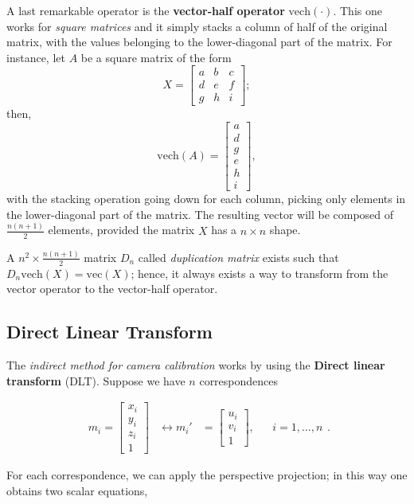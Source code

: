 \documentclass[10pt]{report}
\begin{document}
A last remarkable operator is the \textbf{vector\--half operator} \(\mbox{vech}(\cdot)\). This one works for \emph{square matrices} and it simply stacks a column of half of the original matrix, with the values belonging to the lower\--diagonal part of the matrix. For instance, let \(A\) be a square matrix of the form $$X = \begin{bmatrix} a & b & c \\ d & e & f \\ g & h & i\end{bmatrix};$$ then, $$\mbox{vech}(A) = \begin{bmatrix}a \\ d \\ g \\ e \\ h \\ i\end{bmatrix},$$ with the stacking operation going down for each column, picking only elements in the lower\--diagonal part of the matrix. The resulting vector will be composed of \(\frac{n(n+1)}{2}\) elements, provided the matrix \(X\) has a \(n\times n\) shape.

A \(n^2 \times \frac{n(n+1)}{2}\) matrix \(D_n\) called \emph{duplication matrix} exists such that \(D_n\mbox{vech}(X) = \mbox{vec}(X)\); hence, it always exists a way to transform from the vector operator to the vector\--half operator.
\subsection{Direct Linear Transform}
\label{sec:orgb5db523}
The \emph{indirect method for camera calibration} works by using the \textbf{Direct linear transform} (DLT). Suppose we have \(n\) correspondences

\[\begin{array}{ccccc}m_{i} = \begin{bmatrix} x_i \\ y_i \\ z_i \\ 1 \end{bmatrix} & \longleftrightarrow m_i' & = \begin{bmatrix} u_i\\ v_i \\ 1 \end{bmatrix},& & i = 1,\dots, n\end{array}.\]

For each correspondence, we can apply the perspective projection; in
this way one obtains two scalar equations,
\end{document}
